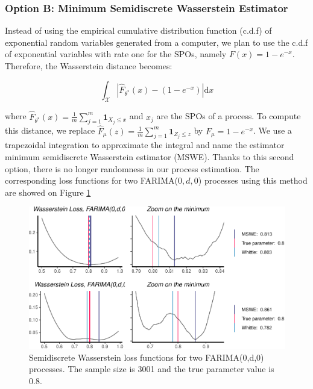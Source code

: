 \documentclass[
  11pt,
]{article}
\begin{document}
\hypertarget{option-b-minimum-semidiscrete-wasserstein-estimator}{%
\subsubsection{Option B: Minimum Semidiscrete Wasserstein
Estimator}\label{option-b-minimum-semidiscrete-wasserstein-estimator}}

Instead of using the empirical cumulative distribution function (c.d.f)
of exponential random variables generated from a computer, we plan to
use the c.d.f of exponential variables with rate one for the SPOs,
namely \(F(x)=1-e^{-x}\). Therefore, the Wasserstein distance becomes:

\begin{equation}
\int_\mathcal{X}\left|\hat F_{\theta^*}(x)- (1 - e^{-x})\right| \mathrm{d} x 
\end{equation}

where
\(\hat F_{\theta^*}(x) = \frac{1}{m} \sum_{j=1}^{m} \mathbf{1}_{X_{j} \leq x}\)
and \(x_j\) are the SPOs of a process. To compute this distance, we
replace
\(\hat F_\mu(z) = \frac{1}{m}\sum_{j=1}^{m} \mathbf{1}_{Z_{j} \leq z}\)
by \(F_\mu = 1 - e^{-x}\). We use a trapezoidal integration to
approximate the integral and name the estimator minimum semidiscrete
Wasserstein estimator (MSWE). Thanks to this second option, there is no
longer randomness in our process estimation. The corresponding loss
functions for two FARIMA(\(0,d,0\)) processes using this method are
showed on Figure \ref{fig:semi_wass}

\begin{figure}

{\centering \includegraphics[width=0.6\linewidth]{Master_thesis_V5_files/figure-latex/semi_wass-1} 

}

\caption{Semidiscrete Wasserstein loss functions for two FARIMA(0,d,0) processes. The sample size is 3001 and the true parameter value is 0.8.}\label{fig:semi_wass}
\end{figure}
\end{document}
